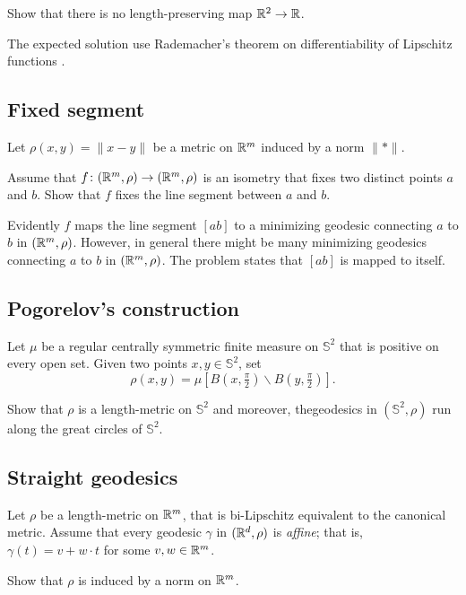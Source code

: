 \begin{pr}
Show that there is no length-preserving map $\mathbb{R}^2\to \mathbb{R}$.
\end{pr}


The expected solution use Rademacher's theorem on differentiability of Lipschitz functions \cite[see][]{rademacher}. 



\subsection*{Fixed segment}
\label{Fixed segment}

\begin{pr}
Let $\rho(x,y)=\|x-y\|$ be a metric on $\mathbb{R}^m$ induced by a norm $\|{*}\|$.

Assume that $f\colon(\mathbb{R}^m,\rho)\to(\mathbb{R}^m,\rho)$ is an isometry that fixes two distinct points $a$ and $b$.
Show that $f$ fixes the line segment between $a$ and $b$.
\end{pr}

Evidently $f$ maps the line segment $[ab]$ to a minimizing geodesic connecting $a$ to $b$ in $(\mathbb{R}^m,\rho)$.
However, in general there might be many minimizing geodesics connecting $a$ to $b$ in $(\mathbb{R}^m,\rho)$.
The problem states that $[ab]$ is mapped to itself.


\subsection*{Pogorelov's construction\easy}
\label{Pogorelov's construction}

\begin{pr}
Let $\mu$ be a regular centrally symmetric finite measure on $\mathbb{S}^2$ that is positive on every open set.
Given two points $x,y\in \mathbb{S}^2$,
set 
\[\rho(x,y)=\mu[B(x,\tfrac \pi2)\backslash B(y,\tfrac\pi2)].\]

Show that $\rho$ is a length-metric on $\mathbb{S}^2$
and moreover, thegeodesics in $(\mathbb{S}^2,\rho)$ run along the great circles of $\mathbb{S}^2$.
\end{pr}

\subsection*{Straight geodesics}
\label{Straight geodesics}

\begin{pr}
Let $\rho$ be a length-metric on $\mathbb{R}^m$, 
that is bi-Lipschitz equivalent to the canonical metric.
Assume that every geodesic $\gamma$ in $(\mathbb{R}^d,\rho)$ is \emph{affine};
that is, $\gamma(t)=v+w\cdot t$ for some $v,w\in\mathbb{R}^m$.

Show that $\rho$ is induced by a norm on $\mathbb{R}^m$.
\end{pr}

